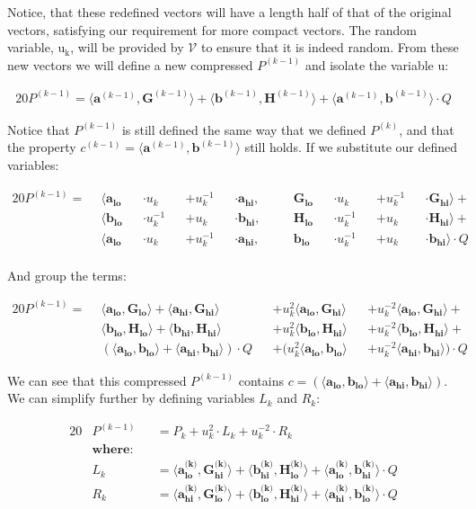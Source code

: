 \documentclass{article}
\newcommand{\eq}[1]{\begin{alignat*}{20}#1\end{alignat*}}
\renewcommand{\vec}[1]{\boldsymbol{#1}}
\newcommand{\ran}[1]{\mathrm{#1}}
\newcommand{\V}{\mathcal{V}}
\newcommand{\dotp}[2]{\langle #1, #2 \rangle}
\newcommand{\opn}[1]{\operatorname{#1}}
\newcommand{\veclo}[1]{\vec{#1_{\opn{lo}}}}
\newcommand{\vechi}[1]{\vec{#1_{\opn{hi}}}}
\begin{document}
Notice, that these redefined vectors will have a length half of that
of the original vectors, satisfying our requirement for more compact
vectors. The random variable, $\ran{u_k}$, will be provided by $\V$
to ensure that it is indeed random. From these new vectors we will
define a new compressed $P^{(k-1)}$ and isolate the variable $\ran{u}$:

\eq{
	P^{(k-1)} =
	\dotp{\vec{a}^{(k-1)}}{\vec{G}^{(k-1)}} +
	\dotp{\vec{b}^{(k-1)}}{\vec{H}^{(k-1)}} +
	\dotp{\vec{a}^{(k-1)}}{\vec{b}^{(k-1)}} \cdot Q
}

Notice that $P^{(k-1)}$ is still defined the same way
that we defined $P^{(k)}$, and that the property $c^{(k-1)} =
\dotp{\vec{a}^{(k-1)}}{\vec{b}^{(k-1)}}$ still holds. If we substitute
our defined variables:

\eq{
	P^{(k-1)} = \: \:
	&\dotp
		{        \veclo{a} &&\cdot u_k      &&+ u_k^{-1} &&\cdot \vechi{a}}
		{&&\quad \veclo{G} &&\cdot u_k      &&+ u_k^{-1} &&\cdot \vechi{G}}
	+ \\
	&\dotp
		{        \veclo{b} &&\cdot u_k^{-1} &&+ u_k      &&\cdot \vechi{b}}
		{&&\quad \veclo{H} &&\cdot u_k^{-1} &&+ u_k      &&\cdot \vechi{H}}
	+ \\
	&\dotp
		{        \veclo{a} &&\cdot u_k      &&+ u_k^{-1} &&\cdot \vechi{a}}
		{&&\quad \veclo{b} &&\cdot u_k^{-1} &&+ u_k      &&\cdot \vechi{b}}
	\cdot Q \\
}

And group the terms:

\eq{
	P^{(k-1)} = \: \:
	        &\dotp{\veclo{a}}{\veclo{G}}            +
	         \dotp{\vechi{a}}{\vechi{G}}          &&+
	u^2_k    \dotp{\veclo{a}}{\vechi{G}}          &&+
	u^{-2}_k \dotp{\veclo{a}}{\vechi{G}}            +\\
	        &\dotp{\veclo{b}}{\veclo{H}}            +
	         \dotp{\vechi{b}}{\vechi{H}}          &&+
	u^2_k    \dotp{\veclo{b}}{\vechi{H}}          &&+
	u^{-2}_k \dotp{\veclo{b}}{\vechi{H}}            +\\
	       &(\dotp{\veclo{a}}{\veclo{b}}            +
		       \dotp{\vechi{a}}{\vechi{b}}) \cdot Q &&+
	(u^2_k   \dotp{\veclo{a}}{\veclo{b}}          &&+
	u^{-2}_k \dotp{\vechi{a}}{\vechi{b}}) \cdot Q
}

We can see that this compressed $P^{(k-1)}$ contains $c =
(\dotp{\veclo{a}}{\veclo{b}} + \dotp{\vechi{a}}{\vechi{b}})$. We can
simplify further by defining variables $L_k$ and $R_k$:

\eq{
	&P^{(k-1)} &&= P_k + u^2_k \cdot L_k + u^{-2}_k \cdot R_k \\
	&\textbf{where:} \\
	&L_k     &&= \dotp{\veclo{a^{\text{(k)}}}}{\vechi{G^{\text{(k)}}}} +
	             \dotp{\vechi{b^{\text{(k)}}}}{\veclo{H^{\text{(k)}}}} + 
	             \dotp{\veclo{a^{\text{(k)}}}}{\vechi{b^{\text{(k)}}}} \cdot Q \\
	&R_k     &&= \dotp{\vechi{a^{\text{(k)}}}}{\veclo{G^{\text{(k)}}}} +
	             \dotp{\veclo{b^{\text{(k)}}}}{\vechi{H^{\text{(k)}}}} +
	             \dotp{\vechi{a^{\text{(k)}}}}{\veclo{b^{\text{(k)}}}} \cdot Q \\
}
\end{document}

